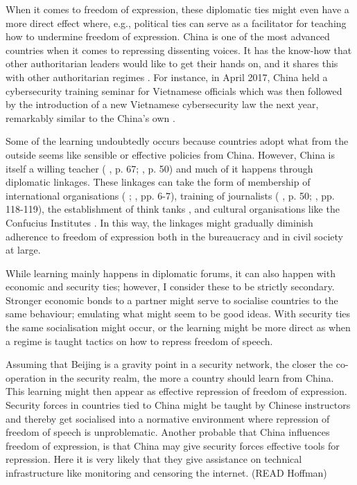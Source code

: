 When it comes to freedom of expression, these diplomatic ties might even have a more direct effect where, e.g., political ties can serve as a facilitator for teaching how to undermine freedom of expression. China is one of the most advanced countries when it comes to repressing dissenting voices. It has the know-how that other authoritarian leaders would like to get their hands on, and it shares this with other authoritarian regimes \citep[pp. 3-6]{economy_exporting_2020}. For instance, in April 2017, China held a cybersecurity training seminar for Vietnamese officials which was then followed by the introduction of a new Vietnamese cybersecurity law the next year, remarkably similar to the China's own \citep[p. 8]{shahbaz_rise_2018}. 

Some of the learning undoubtedly occurs because countries adopt what from the outside seems like sensible or effective policies from China. However, China is itself a willing teacher (\citeauthor{brazys_chinas_2020} \citeyear{brazys_chinas_2020}, p. 67; \citeauthor{repucci_authoritarians_2022} \citeyear{repucci_authoritarians_2022}, p. 50) and much of it happens through diplomatic linkages. These linkages can take the form of membership of international organisations (\citeauthor{ambrosio_catching_2008} \citeyear{ambrosio_catching_2008}; \citeauthor{economy_exporting_2020} \citeyear{economy_exporting_2020}, pp. 6-7), training of journalists (\citeauthor{brazys_chinas_2020} \citeyear{brazys_chinas_2020}, p. 50; \citeauthor{cook_countering_2022} \citeyear{cook_countering_2022}, pp. 118-119), the establishment of think tanks \citep[pp. 15-16]{loughlin_chinese_2021}, and cultural organisations like the Confucius Institutes \citep{popovic_charm_2020}. In this way, the linkages might gradually diminish adherence to freedom of expression both in the bureaucracy and in civil society at large. 

While learning mainly happens in diplomatic forums, it can also happen with economic and security ties; however, I consider these to be strictly secondary. Stronger economic bonds to a partner might serve to socialise countries to the same behaviour; emulating what might seem to be good ideas. With security ties the same socialisation might occur, or the learning might be more direct as when a regime is taught tactics on how to repress freedom of speech. 

Assuming that Beijing is a gravity point in a security network, the closer the co-operation in the security realm, the more a country should learn from China. This learning might then appear as effective repression of freedom of expression. Security forces in countries tied to China might be taught by Chinese instructors and thereby get socialised into a normative environment where repression of freedom of speech is unproblematic. Another probable that China influences freedom of expression, is that China may give security forces effective tools for repression. Here it is very likely that they give assistance on technical infrastructure like monitoring and censoring the internet. (READ Hoffman) 


